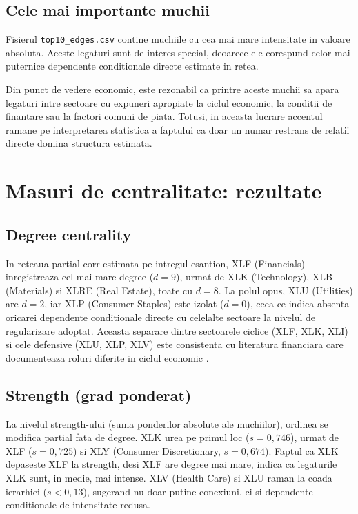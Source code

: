\subsection{Cele mai importante muchii}

Fisierul \texttt{top10\_edges.csv} contine muchiile cu cea mai mare intensitate
in valoare absoluta. Aceste legaturi sunt de interes special, deoarece ele
corespund celor mai puternice dependente conditionale directe estimate in
retea.

Din punct de vedere economic, este rezonabil ca printre aceste muchii sa apara
legaturi intre sectoare cu expuneri apropiate la ciclul economic, la conditii
de finantare sau la factori comuni de piata. Totusi, in aceasta lucrare accentul
ramane pe interpretarea statistica a faptului ca doar un numar restrans de
relatii directe domina structura estimata.

\section{Masuri de centralitate: rezultate}

\subsection{Degree centrality}

In reteaua partial-corr estimata pe intregul esantion, XLF (Financials) inregistreaza
cel mai mare degree ($d = 9$), urmat de XLK (Technology), XLB (Materials) si XLRE
(Real Estate), toate cu $d = 8$. La polul opus, XLU (Utilities) are $d = 2$, iar
XLP (Consumer Staples) este izolat ($d = 0$), ceea ce indica absenta oricarei
dependente conditionale directe cu celelalte sectoare la nivelul de regularizare
adoptat. Aceasta separare dintre sectoarele ciclice (XLF, XLK, XLI) si cele defensive
(XLU, XLP, XLV) este consistenta cu literatura financiara care documenteaza roluri
diferite in ciclul economic \citep{tsay2010}.

\subsection{Strength (grad ponderat)}

La nivelul strength-ului (suma ponderilor absolute ale muchiilor), ordinea se
modifica partial fata de degree. XLK urea pe primul loc ($s = 0{,}746$), urmat
de XLF ($s = 0{,}725$) si XLY (Consumer Discretionary, $s = 0{,}674$). Faptul ca
XLK depaseste XLF la strength, desi XLF are degree mai mare, indica ca legaturile
XLK sunt, in medie, mai intense. XLV (Health Care) si XLU raman la coada ierarhiei
($s < 0{,}13$), sugerand nu doar putine conexiuni, ci si dependente conditionale de
intensitate redusa.


